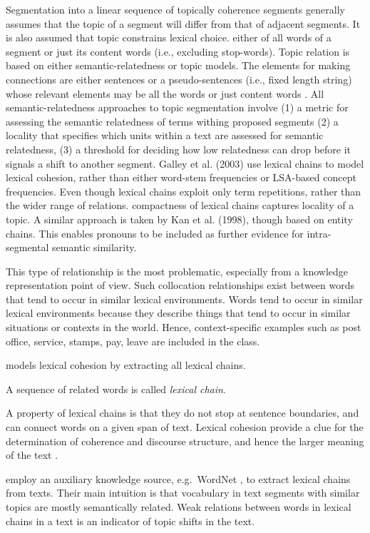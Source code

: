 Segmentation into a linear sequence of topically coherence segments generally assumes that the topic of a segment will differ from that of adjacent segments. It is also assumed that topic constrains lexical choice. either of all words of a segment or just its content words (i.e., excluding stop-words).
Topic relation is based on either semantic-relatedness or topic models. 
The elements for making connections are either sentences or a pseudo-sentences (i.e., fixed length string) whose relevant elements may be all the words or just content words .
All semantic-relatedness approaches to topic segmentation involve (1) a metric for assessing the semantic relatedness of terms withing proposed segments (2) a locality that specifies which units within a text are assessed for semantic relatedness, (3) a threshold for deciding how low relatedness can drop before it signals a shift to another segment.
Galley et al. (2003) use lexical chains to model lexical cohesion, rather than either word-stem frequencies or LSA-based concept frequencies.
Even though lexical chains exploit only term repetitions, rather than the wider range of relations. 
compactness of lexical chains captures locality of a topic. 
A similar approach is taken by Kan et al. (1998), though based on entity chains. 
This enables pronouns to be included as further evidence for intra-segmental semantic similarity. 

This type of relationship is the most problematic, especially from a knowledge representation point of view. Such collocation relationships exist between words that tend to occur in similar lexical environments. Words tend to occur in similar lexical environments because they describe things that tend to occur in similar situations or contexts in the world. Hence, context-specific examples such as {post office, service, stamps, pay, leave} are included in the class.

 models lexical cohesion by extracting all lexical chains. 
\begin{definition}
A sequence of related words is called \emph{lexical chain}. 
\end{definition}
A property of lexical chains is that they do not stop at sentence boundaries, and can connect words on a given span of text. 
Lexical cohesion provide a clue for the determination of coherence and discourse structure, and hence the larger meaning of the text \cite{morris91}. 


 employ an auxiliary knowledge source, e.g.\ WordNet \cite{}, to extract lexical chains from texts. 
Their main intuition is that vocabulary in text segments with similar topics are mostly semantically related. 
Weak relations between words in lexical chains in a text is an indicator of topic shifts in the text. 

